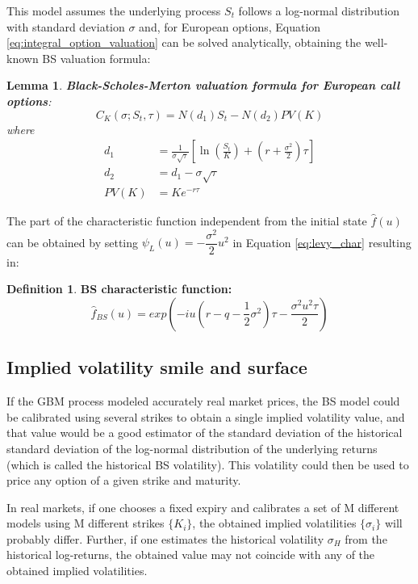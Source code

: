 \documentclass[12,twoside]{mammeTFM}
\newtheorem{lem}[thm]{Lemma}
\theoremstyle{definition}
\newtheorem{definition}[thm]{Definition}
\theoremstyle{remark}
\begin{document}
This model assumes the underlying process $S_t$ follows a log-normal distribution with standard deviation $\sigma$ and, for European options, Equation \ref{eq:integral_option_valuation} can be solved analytically, obtaining the well-known BS valuation formula:

\begin{lem} \textbf{Black-Scholes-Merton valuation formula for European call options}:
\begin{equation}
C_K(\sigma; S_t, \tau) = N(d_1)S_t - N(d_2) PV(K)
\end{equation}
where 
\begin{align}
     d_1 &= \frac{1}{\sigma\sqrt{\tau}}\left[\ln\left(\frac{S_t}{K}\right) + \left(r + \frac{\sigma^2}{2}\right)\tau\right] \\
     d_2 &= d_1 - \sigma\sqrt{\tau} \\
PV(K) &=Ke^{-r\tau}
\end{align}
\end{lem}

The part of the characteristic function independent from the initial state $\hat{f}(u)$ can be obtained by setting $\psi_L (u) = -\dfrac{\sigma^2}{2}u^2$ in Equation \ref{eq:levy_char} resulting in:
\begin{definition} \textbf{BS characteristic function:}
\begin{equation}
\hat{f}_{BS}(u) = exp{\left(-iu \left( r-q - \dfrac{1}{2}\sigma^2 \right) \tau - \dfrac{\sigma^2 u^2 \tau}{2} \right)}
\end{equation}
\end{definition}

\subsection{Implied volatility smile and surface} \label{subsec:smile_and_surf}
If the GBM process modeled accurately real market prices, the BS model could be calibrated using several strikes to obtain a single implied volatility value, and that value would be a good estimator of the standard deviation of the historical standard deviation of the log-normal distribution of the underlying returns (which is called the historical BS volatility). This volatility could then be used to price any option of a given strike and maturity. 

In real markets, if one chooses a fixed expiry and calibrates a set of M different models using M different strikes $\{K_i\}$, the obtained implied volatilities $\{\sigma_i\}$ will probably differ. Further, if one estimates the historical volatility $\sigma_H$ from the historical log-returns, the obtained value may not coincide with any of the obtained implied volatilities.
\end{document}
